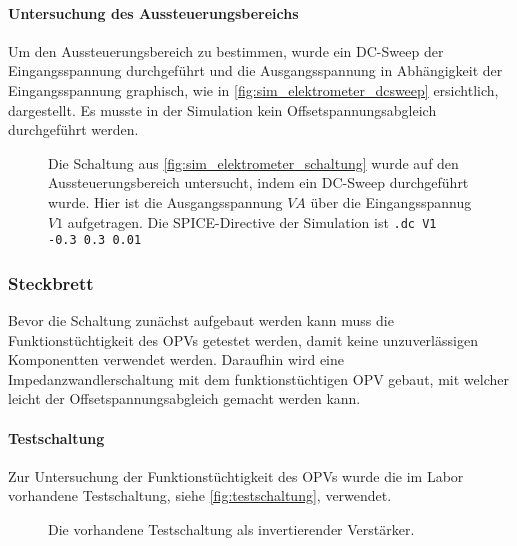 \documentclass[12pt,english,ngerman]{scrartcl}
\begin{document}
\paragraph{Untersuchung des Aussteuerungsbereichs} \label{sec:mess_aussteuerungsbereich}

Um den Aussteuerungsbereich zu bestimmen, wurde ein DC-Sweep der
Eingangsspannung durchgeführt und die Ausgangsspannung in Abhängigkeit der
Eingangsspannung graphisch, wie in \autoref{fig:sim_elektrometer_dcsweep}
ersichtlich, dargestellt. Es musste in der Simulation kein
Offsetspannungsabgleich durchgeführt werden.

\begin{figure}[H]
  \centering
  \caption{Die Schaltung aus \autoref{fig:sim_elektrometer_schaltung} wurde auf
    den Aussteuerungsbereich untersucht, indem ein DC-Sweep durchgeführt wurde.
    Hier ist die Ausgangsspannung $VA$ über die Eingangsspannug $V1$
    aufgetragen. Die SPICE-Directive der Simulation ist \texttt{.dc V1 -0.3 0.3 0.01}}
  \label{fig:sim_elektrometer_dcsweep}
\end{figure}

\subsubsection{Steckbrett} \label{sec:elektrometer_steckbrett}
Bevor die Schaltung zunächst aufgebaut werden kann muss die
Funktionstüchtigkeit des OPVs getestet werden, damit keine unzuverlässigen
Komponentten verwendet werden. Daraufhin wird eine Impedanzwandlerschaltung mit
dem funktionstüchtigen OPV gebaut, mit welcher leicht der
Offsetspannungsabgleich gemacht werden kann.


\paragraph{Testschaltung}
Zur Untersuchung der Funktionstüchtigkeit des OPVs wurde die im Labor vorhandene
Testschaltung, siehe \autoref{fig:testschaltung}, verwendet. 

\begin{figure}[H]
  \centering
  \caption{Die vorhandene Testschaltung als invertierender Verstärker.}
  \label{fig:testschaltung}
\end{figure}
\end{document}
